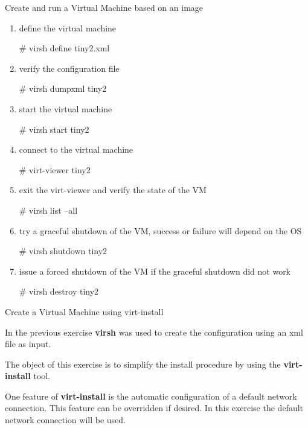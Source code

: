 \begin{Lab}
\begin{exe} {Create and run a Virtual Machine based on an image}
\begin{sol}
\begin{enumerate}
		\item define the virtual machine 
			\begin{raw}
# virsh define tiny2.xml
			\end{raw}
		\item verify the configuration file 
			\begin{raw}
# virsh dumpxml tiny2 
			\end{raw}
		\item start the virtual machine 
			\begin{raw}
# virsh start tiny2
			\end{raw}
		\item connect to the virtual machine
			\begin{raw}
# virt-viewer tiny2 
			\end{raw}
		\item exit the virt-viewer and verify the state of the VM
			\begin{raw}
# virsh list --all 
			\end{raw}
		\item try a graceful shutdown of the VM, 
			success or failure will depend on the OS
			\begin{raw}
# virsh shutdown tiny2 
			\end{raw}
		\item issue a forced shutdown of the VM 
			if the graceful shutdown did not work
			\begin{raw}
# virsh destroy tiny2 
			\end{raw} 
		\end{enumerate}

	\end{sol}
\end{exe}

\begin{exe}  {Create a Virtual Machine using virt-install}

	
	In the previous exercise \textbf{virsh} 
	was used to create the configuration using an xml file as input.


	The object of this exercise is to simplify the install procedure 
	by using the \textbf{virt-install} tool. 

	One feature of \textbf{virt-install} is the 
	automatic configuration of a default network connection. 
	This feature can be overridden if desired. In this exercise the default 
	network connection will be used. 


\end{exe}
\end{Lab}

